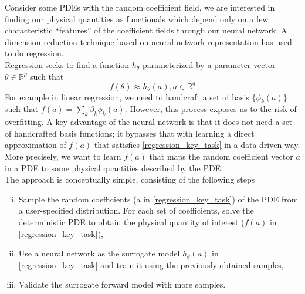 Consider some PDEs with the random coefficient field, we are interested in finding our physical quantities as functionals which depend only on a few characteristic ``features'' of the coefficient fields through our neural network. A dimension reduction technique based on neural network representation has used to do regression.\\
Regression seeks to find a function $h_{\theta}$ parameterized by a parameter vector $\theta \in \mathbb{R}^{p}$ such that
\begin{equation}
f(\theta) \approx h_{\theta}(a), a\in \mathbb{R}^{q}
\label{regression_key_task}
\end{equation}
For example in linear regression, we need to handcraft a set of basis $\{\phi_k(a)\}$ such that $f(a) = \sum_{k} \beta_k \phi_k(a)$. However, this process exposes us to the risk of overfitting. A key advantage of the neural network is that it does not need a set of handcrafted basis functions; it bypasses that with learning a direct approximation of $f(a)$ that satisfies \eqref{regression_key_task} in a data driven way.\\
More precisely, we want to learn $f(a)$ that maps the random coefficient vector $a$ in a PDE to some physical quantities described by the PDE.\\
The approach is conceptually simple, consisting of the following steps
\begin{enumerate}[i.]
	\item Sample the random coefficients (a in \eqref{regression_key_task}) of the PDE from a user-specified distribution. For each set of coefficients, solve the deterministic PDE to obtain the physical quantity of interest ($f(a)$ in \eqref{regression_key_task}),
	\item Use a neural network as the surrogate model $h_{\theta}(a)$ in \eqref{regression_key_task} and train it using the previously obtained samples,
	\item  Validate the surrogate forward model with more samples. 
\end{enumerate}
